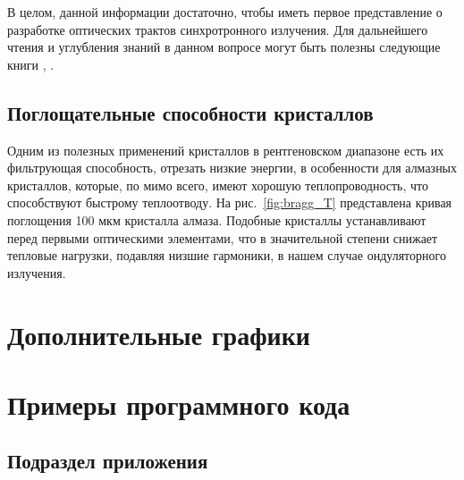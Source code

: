 В целом, данной информации достаточно, чтобы иметь первое представление о разработке оптических трактов синхротронного излучения. Для дальнейшего чтения и углубления знаний в данном вопросе могут быть полезны следующие книги \cite{als2011elements}, \cite{authier2006dynamical}.

\section{Поглощательные способности кристаллов}
Одним из полезных применений кристаллов в рентгеновском диапазоне есть их фильтрующая способность, отрезать низкие энергии, в особенности для алмазных кристаллов, которые, по мимо всего, имеют хорошую теплопроводность, что способствуют быстрому теплоотводу. На рис.~\ref{fig:bragg_T} представлена кривая поглощения 100 мкм кристалла алмаза. Подобные кристаллы устанавливают перед первыми оптическими элементами, что в значительной степени снижает тепловые нагрузки, подавляя низшие гармоники, в нашем случае ондуляторного излучения. 
\chapter{Дополнительные графики} \label{AppendixA}

\chapter{Примеры программного кода} \label{AppendixB}

\section{Подраздел приложения}\label{AppendixB1}

\normalsize%
